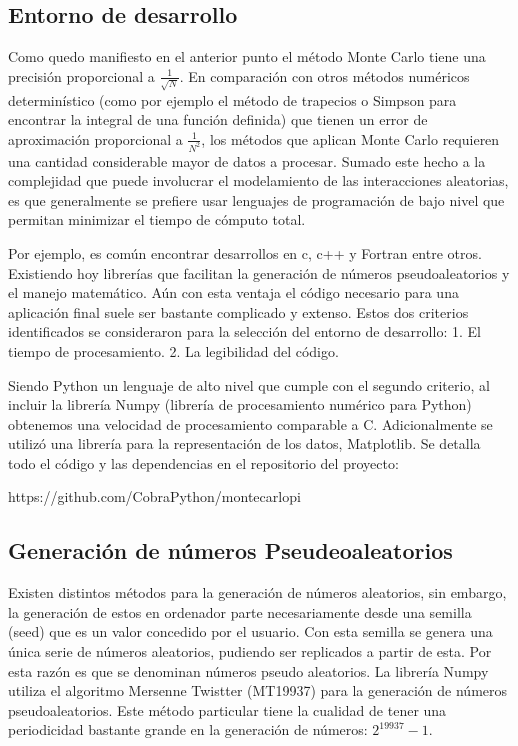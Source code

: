 \documentclass{rbf}
\begin{document}
\subsection{Entorno de desarrollo}

Como quedo manifiesto en el anterior punto el método Monte Carlo tiene una precisión proporcional a $\frac{1}{\sqrt{N}}$. En comparación con otros métodos numéricos determinístico (como por ejemplo el método de trapecios o Simpson para encontrar la integral de una función definida) que tienen un error de aproximación proporcional a $\frac{1}{N^2}$, los métodos que aplican Monte Carlo requieren una cantidad considerable mayor de datos a procesar. Sumado este hecho a la complejidad que puede involucrar el modelamiento de las interacciones aleatorias, es que generalmente se prefiere usar lenguajes de programación de bajo nivel que permitan minimizar el tiempo de cómputo total.

Por ejemplo, es común encontrar desarrollos en c, c++ y Fortran entre otros. Existiendo hoy librerías que facilitan la generación de números pseudoaleatorios y el manejo matemático. Aún con esta ventaja el código necesario para una aplicación final suele ser bastante complicado y extenso.
Estos dos criterios identificados se consideraron para la selección del entorno de desarrollo:
1. El tiempo de procesamiento.
2. La legibilidad del código.

Siendo Python un lenguaje de alto nivel que cumple con el segundo criterio, al incluir la librería Numpy (librería de procesamiento numérico para Python) obtenemos una velocidad de procesamiento comparable a C. Adicionalmente se utilizó una librería para la representación de los datos, Matplotlib.
Se detalla todo el código y las dependencias en el repositorio del proyecto:

https://github.com/CobraPython/montecarlopi

\subsection{Generación de números Pseudeoaleatorios}

Existen distintos métodos para la generación de números aleatorios, sin embargo, la generación de estos en ordenador parte necesariamente desde una semilla (seed) que es un valor concedido por el usuario. Con esta semilla se genera una única serie de números aleatorios, pudiendo ser replicados a partir de esta. Por esta razón es que se denominan números pseudo aleatorios.
La librería Numpy utiliza el algoritmo Mersenne Twistter (MT19937) \cite{Tanguy} para la generación de números pseudoaleatorios. Este método particular tiene la cualidad de tener una periodicidad bastante grande en la generación de números: $2^{19937}−1$\cite{Makoto}.
\end{document}
